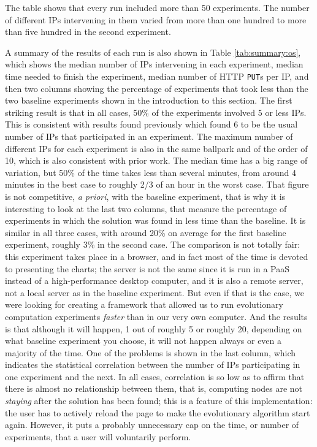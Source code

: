 \documentclass[journal,onecolumn]{IEEEtran}
\begin{document}
%
The table shows that every run included more than 50 experiments. The
number of different IPs intervening in them varied from more than one
hundred to more than five hundred in the second experiment.

A summary of the results of each run is also shown in Table
\ref{tab:summary:os}, which shows the median number of IPs
intervening in each experiment,  median time needed
to finish the experiment, median number of HTTP {\tt PUT}s per IP, and
then two columns showing the percentage of experiments that took less
than the two baseline experiments shown in the introduction to this
section. The first striking result is that in all cases, 50\% of the
experiments involved 5 or less IPs. This is consistent with results
found previously \cite{DBLP:conf/gecco/GuervosG15} which found 6 to be
the usual number of IPs that participated in an experiment. The
maximum number of different IPs for each experiment is also in the
same ballpark and of the order of 10, which is also consistent with
prior work. The median time has a big range of variation, but 50\% of
the time takes less than several minutes, from around 4 minutes in the
best case to roughly 2/3 of an hour in the worst case. That figure is
not competitive, {\em a priori}, with the baseline experiment, that is
why it is interesting to look at the last two columns, that measure
the percentage of experiments in which the solution was found in less
time than the baseline. It is similar in all three cases, with around
20\% on average for the first baseline experiment, roughly 3\% in the
second case. The comparison is not totally fair: this experiment takes
place in a browser, and in fact most of the time is devoted to
presenting the charts; the server is not the same since it is run in a
PaaS instead of a high-performance desktop computer, and it is also a
remote server, not a local server as in the baseline experiment. But
even if that is the case, we were looking for creating a framework that
allowed us to run evolutionary computation experiments {\em faster} than
in our very own computer. And the results is that although it will
happen, 1 out of roughly 5 or roughly 20, depending on what baseline
experiment you choose, it will not happen always or even a majority of
the time. One of the problems is shown in the last column, which
indicates the statistical correlation between the number of IPs
participating in one experiment and the next. In all cases,
correlation is so low as to affirm that there is almost no
relationship between them, that is, computing nodes are not {\em
  staying} after the solution has been found; this is a feature of
this implementation: the user has to actively reload the page to make
the evolutionary algorithm start again. However, it puts a probably
unnecessary cap on the time, or number of experiments, that a user
will voluntarily perform.
\end{document}
